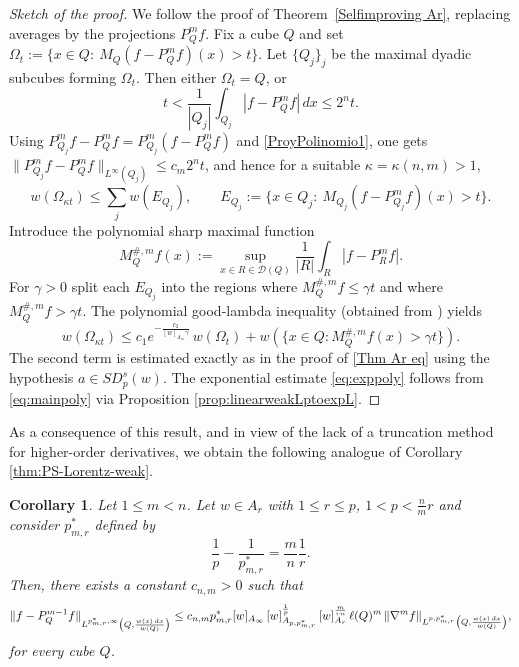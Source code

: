 \documentclass[reqno, 10pt, oneside]{amsart}
\numberwithin{equation}{section}
\newcommand{\strt}[1]{\rule{0pt}{#1}}
\newtheorem{corollary}[theorem]{Corollary}
\numberwithin{theorem}{section}
\newcommand{\1}{{\rm 1\hspace*{-0.4ex}%
\rule{0.1ex}{1.52ex}\hspace*{0.2ex}}}
\begin{document}
\begin{proof}[Sketch of the proof]
We follow the proof of Theorem~\ref{Selfimproving Ar}, replacing averages by the projections $P_Q^m f$. Fix a cube $Q$ and set $\Omega_t:=\{x\in Q:\ M_Q(f-P_Q^m f)(x)>t\}$. Let $\{Q_j\}_j$ be the maximal dyadic subcubes forming $\Omega_t$. Then either $\Omega_t=Q$, or
\begin{equation*}
    t<\frac{1}{|Q_j|}\int_{Q_j}|f-P_Q^m f|\,dx\le 2^n t.
\end{equation*}
Using $P_{Q_j}^m f-P_Q^m f=P_{Q_j}^m(f-P_Q^m f)$ and \eqref{ProyPolinomio1}, one gets $\|P_{Q_j}^m f-P_Q^m f\|_{L^\infty(Q_j)}\le c_m 2^n  t$, and hence for a suitable $\kappa=\kappa(n,m)>1$,
\begin{equation*}
    w(\Omega_{\kappa t})\le \sum_j w(E_{Q_j}), \qquad E_{Q_j}:=\{x\in Q_j:\ M_{Q_j}(f-P_{Q_j}^m f)(x)>t\}.
\end{equation*}
Introduce the polynomial sharp maximal function
\begin{equation*}
    M_Q^{\#,m}f(x):=\sup_{x\in R\in\mathcal D(Q)}\frac{1}{|R|}\int_R |f-P_R^m f|.
\end{equation*}
For $\gamma>0$ split each $E_{Q_j}$ into the regions where $M_Q^{\#,m}f\le \gamma t$ and where $M_Q^{\#,m}f>\gamma t$. The polynomial good-lambda inequality (obtained from \cite[Theorem~7.1]{CP}) yields
\begin{equation*}
    w(\Omega_{\kappa t})\le c_1 e^{-\frac{c_2}{[w]_{A_\infty}\gamma}}\,w(\Omega_t) + w(\{x\in Q : M_Q^{\#,m}f(x)>\gamma t\}).
\end{equation*}
The second term is estimated exactly as in the proof of \eqref{Thm Ar eq} using the hypothesis $a\in SD_p^s(w)$. The exponential estimate \eqref{eq:exppoly} follows from \eqref{eq:mainpoly} via Proposition \ref{prop:linearweakLptoexpL}.
\end{proof}


As a consequence of this result, and in view of the lack of a truncation method for higher-order derivatives, we obtain the following analogue of Corollary \ref{thm:PS-Lorentz-weak}.

\begin{corollary}\label{cor:PS-Lorentz-weak-poly}
Let $1\le m <n$. Let $w\in A_r$ with $1\le r\le p$, $1< p< \frac{n}{m}r$ and consider $p_{m,r}^{*}$ defined by
\begin{equation*}
    \frac{1}{p}-\frac{1}{p_{m,r}^{*}}= \frac{m}{n} \frac{1}{r}.
\end{equation*}
Then, there exists a constant $c_{n,m}>0$ such that 
\begin{equation*}
	\|f-P_Q^{m-1}f\|_{\strt{2.3ex} L^{p_{m,r}^{*},\infty}\left(Q, \frac{w(x)\,dx}{w(Q)}\right)} \le c_{n,m} p^*_{m,r} [w]_{A_\infty}\,[w]_{A_{p,p_{m,r}^{*}}}^{\frac{1}{p}}\,[w]_{A_r}^{\frac{m}{rn}}\, \ell(Q)^m \,\|\nabla^m f\|_{L^{p,p_{m,r}^{*}}\left(Q,\frac{w(x)\,dx}{w(Q)}\right)},
\end{equation*}
for every cube $Q$. 
\end{corollary}
\end{document}

